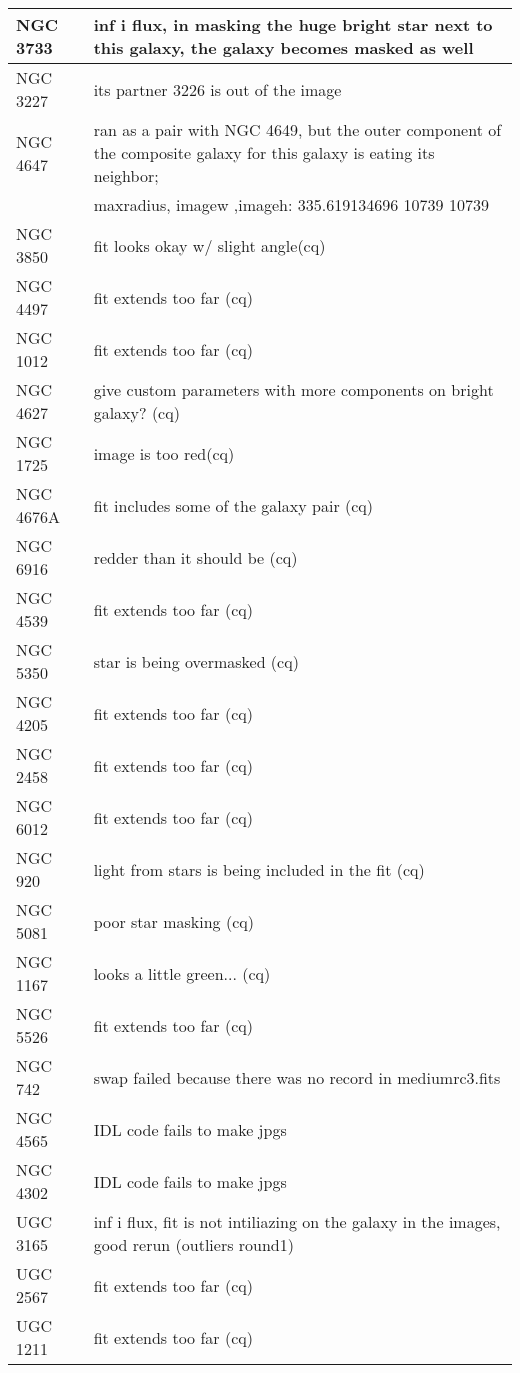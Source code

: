 \documentclass[10pt]{article}
\begin{document}
\begin{landscape}
\begin{longtable}{|l|l|}
NGC 3733 & inf i flux, in masking the huge bright star next to this galaxy, the galaxy becomes masked as well \\ \hline
NGC 3227 & its partner 3226 is out of the image\\ \hline
NGC 4647 & ran as a pair with NGC 4649, but the outer component of the composite galaxy for this galaxy is eating its neighbor;\\ \hline
 & maxradius, imagew ,imageh: 335.619134696 10739 10739 \\ \hline
NGC 3850 & fit looks okay w/ slight angle(cq)\\ \hline
NGC 4497 & fit extends too far (cq)\\ \hline
NGC 1012 & fit extends too far (cq)\\ \hline
NGC 4627 & give custom parameters with more components on bright galaxy? (cq) \\ \hline
NGC 1725 & image is too red(cq) \\ \hline
NGC 4676A & fit includes some of the galaxy pair (cq) \\ \hline
NGC 6916 & redder than it should be (cq) \\ \hline
NGC 4539 & fit extends too far (cq) \\ \hline
NGC 5350 & star is being overmasked (cq) \\ \hline
NGC 4205 & fit extends too far (cq)\\ \hline
NGC 2458 & fit extends too far (cq)\\ \hline
NGC 6012 & fit extends too far (cq)\\ \hline
NGC 920 & light from stars is being included in the fit (cq)\\ \hline
NGC 5081 & poor star masking (cq)\\ \hline
NGC 1167 & looks a little green... (cq)\\ \hline
NGC 5526 & fit extends too far (cq)\\ \hline
NGC 742 & swap failed because there was no record in mediumrc3.fits \\ \hline
NGC 4565 & IDL code fails to make jpgs \\ \hline
NGC 4302 & IDL code fails to make jpgs \\ \hline
UGC 3165 & inf i flux, fit is not intiliazing on the galaxy in the images, good rerun (outliers round1)\\ \hline
UGC 2567 & fit extends too far (cq)\\ \hline
UGC 1211 & fit extends too far (cq)\\ \hline

\end{longtable}
\end{landscape}
\end{document}
